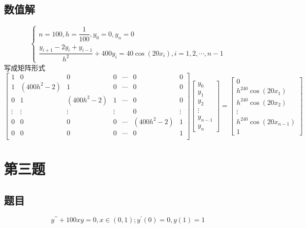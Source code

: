 \documentclass{ctexart}
\numberwithin{equation}{section}
\begin{document}
\subsection{数值解}
\begin{equation}
    \left\{
        \begin{array}{l}
            n = 100,h=\dfrac{1}{100},y_0=0,y_n=0\\
            \dfrac{y_{i+1}-2y_{i}+y_{i-1}}{h^2}+400y_i=40\cos(20x_i),i = 1,2,\cdots,n-1
        \end{array}
            \right.
\end{equation}
写成矩阵形式
\begin{equation}
    \begin{bmatrix}
        1 & 0 & 0 & 0 & \cdots & 0 & 0\\
        1 & (400h^2-2) & 1 & 0 & \cdots & 0 & 0\\
        0 & 1 & (400h^2-2) & 1 & \cdots & 0 & 0\\
        \vdots & \vdots & \vdots & \vdots &  & 0 & \vdots\\
        0 & 0 & 0 & 0 & \cdots & (400h^2-2) & 1\\
        0 & 0 & 0 & 0 & \cdots & 0 & 1\\
    \end{bmatrix}
    \begin{bmatrix}
        y_0\\
        y_1\\
        y_2\\
        \vdots\\
        y_{n-1}\\
        y_n
    \end{bmatrix}
    =
    \begin{bmatrix}
        0\\
        h^240\cos(20x_1)\\
        h^240\cos(20x_2)\\
        \vdots\\
        h^240\cos(20x_{n-1})\\
        1
    \end{bmatrix}
\end{equation}
\section{第三题}
\subsection{题目}
\[y^{\prime \prime}+100 x y=0, x \in(0,1) ; y^{\prime}(0)=0, y(1)=1\] 
\end{document}
